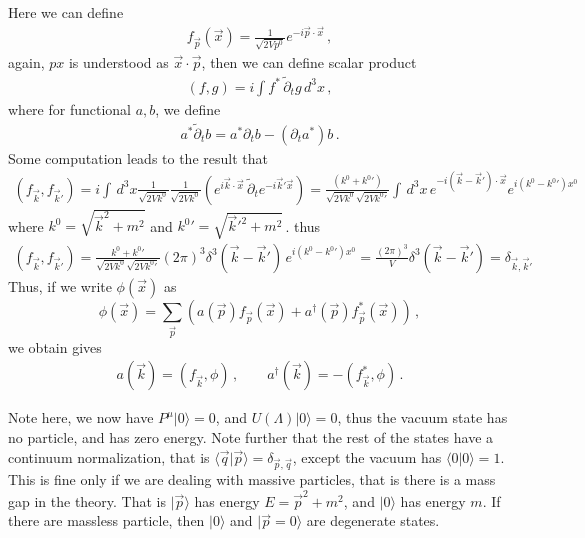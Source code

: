 \documentclass[11pt, onesided]{book}
\theoremstyle{break}
\theoremstyle{break}
\newcommand{\pd}{\partial}
\newcommand{\that}[1]{\widetilde{#1}}
\begin{document}
Here we can define
\begin{align*}
f_{\vec{p}}(\vec{x}) = \frac{1}{\sqrt{2Vp^0}}e^{-i\vec{p}\cdot\vec{x}}\,,
\end{align*}
again, $px$ is understood as $\vec{x}\cdot \vec{p}$, then we can define scalar product
\begin{align*}
(f,g) = i \int f^*\, \that{\pd}_t g\,  d^3x\,,
\end{align*}
where for functional $a, b$, we define
\begin{align*}
a^* \that{\pd}_t b = a^* \pd_t b - (\pd_t a^*) b\,.
\end{align*}
Some computation leads to the result that
\begin{align*}
(f_{\vec{k}}, f_{\vec{k}'}) = i \int \, d^3x \frac{1}{\sqrt{2Vk^0}} \frac{1}{\sqrt{2Vk^0}}\left( e^{i\vec{k}\cdot\vec{x}}\, \that{\pd}_t e^{-i \vec{k}'\vec{x}}\right) = \frac{(k^0 + {k^0}')}{\sqrt{2Vk^0} \sqrt{2V{k^0}'}}
\int\, d^3x\, e^{-i (\vec{k}-\vec{k}')\cdot \vec{x}} e^{i(k^0 - {k^0}')x^0}
\end{align*}
where $k^0 = \sqrt{\vec{k}^2 + m^2}$ and ${k^0}' = \sqrt{\vec{k}'^2 + m^2}$\,.
thus
\begin{align*}
(f_{\vec{k}}, f_{\vec{k}'}) = \frac{k^0 + {k^0}'}{\sqrt{2Vk^0} \sqrt{2V{k^0}'}} (2\pi)^3 \delta^3(\vec{k} - \vec{k}')\, e^{i(k^0 - {k^0}') x^0}
= \frac{(2\pi)^3}{V} \delta^3(\vec{k} - \vec{k}') = \delta_{\vec{k}, \vec{k}'}
\end{align*}
Thus, if we write $\phi(\vec{x})$ as
$$\phi(\vec{x}) = \sum_{\vec{p}} \left( a(\vec{p}) f_{\vec{p}}(\vec{x}) + a^\dagger(\vec{p}) f^*_{\vec{p}} (\vec{x})\right)\,,$$ 
we obtain gives 
\begin{align*}
a(\vec{k}) = (f_{\vec{k}}, \phi)\,,\qquad 
a^\dagger(\vec{k}) = -(f_{\vec{k}}^*,\phi)\,.
\end{align*}

Note here, we now have $P^\mu|0\rangle = 0$, and $U(\Lambda) | 0\rangle = 0$, thus the vacuum state has no particle, and has zero energy. Note further that the rest of the states have a continuum normalization, that is
$\langle \vec{q} | \vec{p}\rangle = \delta_{\vec{p},\vec{q}}$, except the vacuum has $\langle 0 | 0 \rangle = 1$. This is fine only if we are dealing with massive particles, that is there is a mass gap in the theory. That is $|\vec{p}\rangle$ has energy $E = \vec{p}^2 + m^2$, and $|0\rangle$ has energy $m$. If there are massless particle, then $|0\rangle$ and $|\vec{p}=0\rangle$ are degenerate states. 
\end{document}
